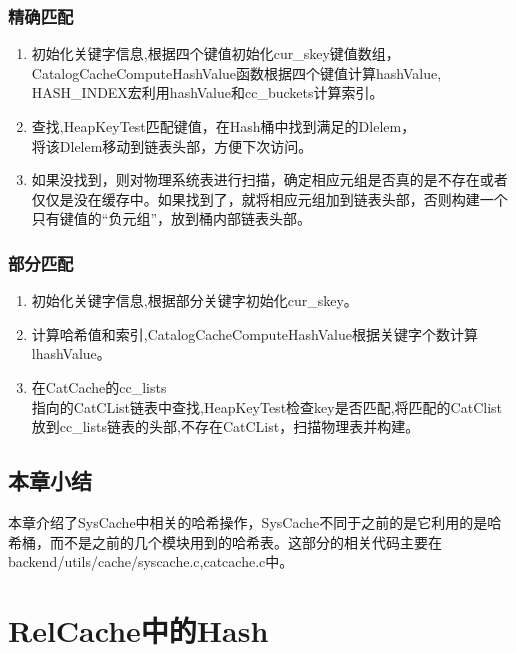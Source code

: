 \documentclass{article}
\begin{document}
\begin{CJK*}{UTF8}{gkai}
\subsubsection{精确匹配}

\begin{enumerate}
	\item 初始化关键字信息,根据四个键值初始化cur\_skey键值数组，\\CatalogCacheComputeHashValue函数根据四个键值计算hashValue,\\HASH\_INDEX宏利用hashValue和cc\_buckets计算索引。
	\item 查找,HeapKeyTest匹配键值，在Hash桶中找到满足的Dlelem，\\将该Dlelem移动到链表头部，方便下次访问。
	\item 如果没找到，则对物理系统表进行扫描，确定相应元组是否真的是不存在或者仅仅是没在缓存中。如果找到了，就将相应元组加到链表头部，否则构建一个只有键值的“负元组”，放到桶内部链表头部。
\end{enumerate}


\subsubsection{部分匹配}
\begin{enumerate}

	\item 初始化关键字信息,根据部分关键字初始化cur\_skey。
	\item 计算哈希值和索引,CatalogCacheComputeHashValue根据关键字个数计算lhashValue。
	\item 在CatCache的cc\_lists\\指向的CatCList链表中查找,HeapKeyTest检查key是否匹配,将匹配的CatClist放到cc\_lists链表的头部,不存在CatCList，扫描物理表并构建。\\
\end{enumerate}

\subsection{本章小结}
\indent 本章介绍了SysCache中相关的哈希操作，SysCache不同于之前的是它利用的是哈希桶，而不是之前的几个模块用到的哈希表。这部分的相关代码主要在backend/utils/cache/syscache.c,catcache.c中。



\section{RelCache中的Hash} 


\end{CJK*}
\end{document}
